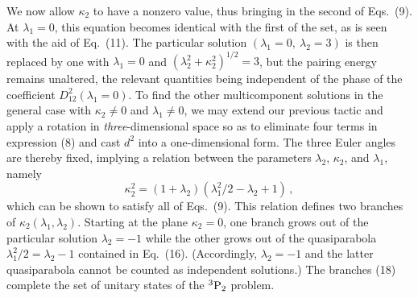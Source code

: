 We now allow $\kappa_2$ to have a nonzero value, thus bringing in
the second of Eqs.~(9).  At $\lambda_1=0$, this equation becomes identical
with the first of the set, as is seen with the aid of Eq.~(11).  
The particular solution $(\lambda_1=0,~\lambda_2=3)$ is then replaced 
by one with $\lambda_1=0$ and $(\lambda_2^2+\kappa_2^2)^{1/2}=3$, but 
the pairing energy remains unaltered, the relevant quantities being
independent of the phase of the coefficient $D^2_{12}(\lambda_1=0)$. 
To find the other multicomponent solutions in the general case with 
$\kappa_2\neq 0$ and $\lambda_1\neq 0$, we may extend our previous 
tactic and apply a rotation in {\it three}-dimensional
space so as to eliminate four terms in expression (8) and cast
$d^2$ into a one-dimensional form.  The three Euler angles are 
thereby fixed, implying a relation between the parameters $\lambda_2$,
$\kappa_2$, and $\lambda_1$, namely 
\begin{equation}
  \kappa^2_2=(1+\lambda_2)(\lambda^2_1/2-\lambda_2+1) \, ,
\end{equation}
which can be shown to satisfy all of Eqs.~(9).  This relation defines
two branches of $\kappa_2(\lambda_1,\lambda_2)$.  Starting at the plane 
$\kappa_2=0$, one branch grows out of the particular solution 
$\lambda_2=-1$ while the other grows out of the quasiparabola 
$\lambda^2_1/2=\lambda_2-1$ contained in Eq.~(16).  (Accordingly,
$\lambda_2=-1$ and the latter quasiparabola cannot be counted
as independent solutions.)  The branches (18) complete the set 
of unitary states of the $^3{\rm P}_2$ problem.

